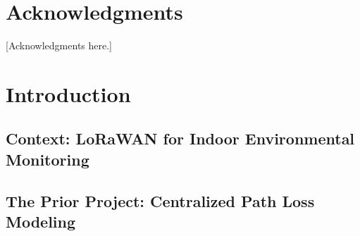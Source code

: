 \documentclass[12pt, a4paper, twoside, openright]{report}
\begin{document}
\chapter*{Acknowledgments}
[Acknowledgments here.]
\clearpage

\tableofcontents\clearpage
\listoffigures{}\clearpage
\listoftables{}\clearpage
\printglossary[type=\acronymtype,title=List of Abbreviations]\clearpage

\setcounter{page}{1}

\chapter{Introduction}
\label{ch:introduction}

\section{Context: LoRaWAN for Indoor Environmental Monitoring}
\label{sec:context}

\section{The Prior Project: Centralized Path Loss Modeling}
\label{sec:prior-project}

\end{document}
